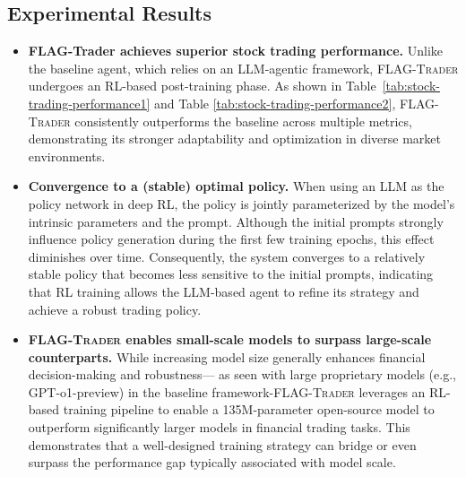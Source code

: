 \subsection{Experimental Results}
\begin{itemize}
    \item \noindent\textbf{FLAG-Trader achieves superior stock trading performance.} Unlike the baseline agent, which relies on an LLM-agentic framework, \textsc{FLAG-Trader} undergoes an RL-based post-training phase. As shown in Table~\ref{tab:stock-trading-performance1} and Table \ref{tab:stock-trading-performance2}, \textsc{FLAG-Trader} consistently outperforms the baseline across multiple metrics, demonstrating its stronger adaptability and optimization in diverse market environments.

    \item \textbf{Convergence to a (stable) optimal policy.} When using an LLM as the policy network in deep RL, the policy is jointly parameterized by the model’s intrinsic parameters and the prompt. Although the initial prompts strongly influence policy generation during the first few training epochs, this effect diminishes over time. Consequently, the system converges to a relatively stable policy that becomes less sensitive to the initial prompts, indicating that RL training allows the LLM-based agent to refine its strategy and achieve a robust trading policy.

    \item \noindent\textbf{\textsc{FLAG-Trader} enables small-scale models to surpass large-scale counterparts.} While increasing model size generally enhances financial decision-making and robustness— as seen with large proprietary models (e.g., GPT-o1-preview) in the baseline framework-\textsc{FLAG-Trader} leverages an RL-based training pipeline to enable a 135M-parameter open-source model to outperform significantly larger models in financial trading tasks. This demonstrates that a well-designed training strategy can bridge or even surpass the performance gap typically associated with model scale. 


\end{itemize}

 



